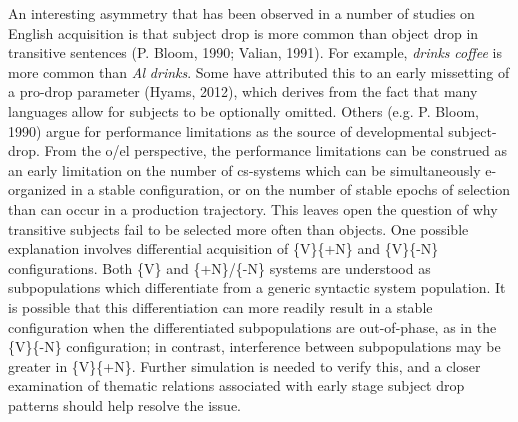   An interesting asymmetry that has been observed in a number of studies on English acquisition is that subject drop is more common than object drop in transitive sentences (P. Bloom, 1990; Valian, 1991). For example, \textit{drinks} \textit{coffee} is more common than \textit{Al} \textit{drinks}. Some have attributed this to an early missetting of a pro-drop parameter (Hyams, 2012), which derives from the fact that many languages allow for subjects to be optionally omitted. Others (e.g. P. Bloom, 1990) argue for performance limitations as the source of developmental subject-drop. From the o/el perspective, the performance limitations can be construed as an early limitation on the number of cs-systems which can be simultaneously e-organized in a stable configuration, or on the number of stable epochs of selection than can occur in a production trajectory. This leaves open the question of why transitive subjects fail to be selected more often than objects. One possible explanation involves differential acquisition of \{V\}\{+N\} and \{V\}\{-N\} configurations. Both \{V\} and \{+N\}/\{-N\} systems are understood as subpopulations which differentiate from a generic syntactic system population. It is possible that this differentiation can more readily result in a stable configuration when the differentiated subpopulations are out-of-phase, as in the \{V\}\{-N\} configuration; in contrast, interference between subpopulations may be greater in \{V\}\{+N\}. Further simulation is needed to verify this, and a closer examination of thematic relations associated with early stage subject drop patterns should help resolve the issue.

